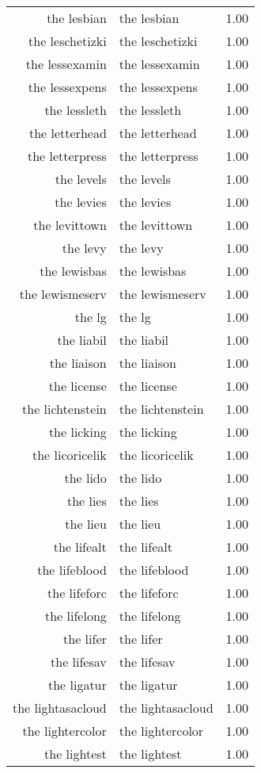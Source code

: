\begin{table}[ht]
\begin{tabular}{rlr}
  the lesbian & the lesbian & 1.00 \\ 
  the leschetizki & the leschetizki & 1.00 \\ 
  the lessexamin & the lessexamin & 1.00 \\ 
  the lessexpens & the lessexpens & 1.00 \\ 
  the lessleth & the lessleth & 1.00 \\ 
  the letterhead & the letterhead & 1.00 \\ 
  the letterpress & the letterpress & 1.00 \\ 
  the levels & the levels & 1.00 \\ 
  the levies & the levies & 1.00 \\ 
  the levittown & the levittown & 1.00 \\ 
  the levy & the levy & 1.00 \\ 
  the lewisbas & the lewisbas & 1.00 \\ 
  the lewismeserv & the lewismeserv & 1.00 \\ 
  the lg & the lg & 1.00 \\ 
  the liabil & the liabil & 1.00 \\ 
  the liaison & the liaison & 1.00 \\ 
  the license & the license & 1.00 \\ 
  the lichtenstein & the lichtenstein & 1.00 \\ 
  the licking & the licking & 1.00 \\ 
  the licoricelik & the licoricelik & 1.00 \\ 
  the lido & the lido & 1.00 \\ 
  the lies & the lies & 1.00 \\ 
  the lieu & the lieu & 1.00 \\ 
  the lifealt & the lifealt & 1.00 \\ 
  the lifeblood & the lifeblood & 1.00 \\ 
  the lifeforc & the lifeforc & 1.00 \\ 
  the lifelong & the lifelong & 1.00 \\ 
  the lifer & the lifer & 1.00 \\ 
  the lifesav & the lifesav & 1.00 \\ 
  the ligatur & the ligatur & 1.00 \\ 
  the lightasacloud & the lightasacloud & 1.00 \\ 
  the lightercolor & the lightercolor & 1.00 \\ 
  the lightest & the lightest & 1.00 \\ 

\end{tabular}
\end{table}
